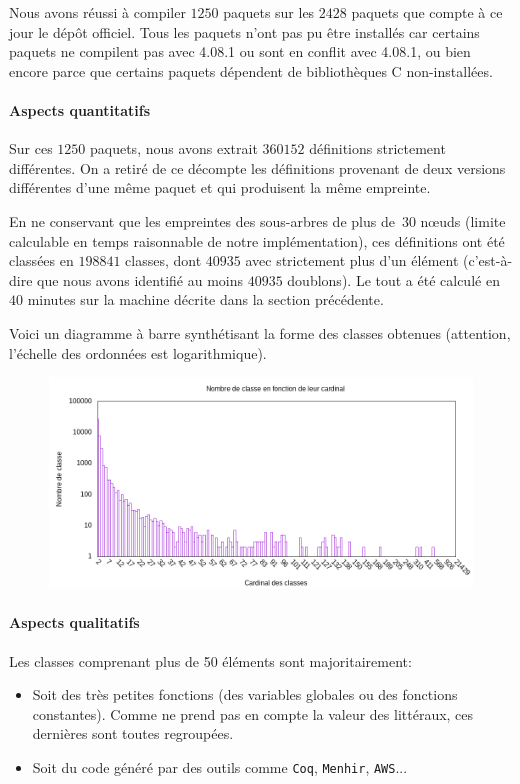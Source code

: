 Nous avons réussi à compiler $1250$ paquets sur les $2428$ paquets que
compte à ce jour le dépôt {\Opam} officiel. Tous les paquets n'ont pas
pu être installés car
certains paquets ne compilent pas avec {\OCaml} 4.08.1 ou
sont en conflit avec {\OCaml} 4.08.1, ou bien encore parce que
certains paquets dépendent de bibliothèques C non-installées.

\paragraph{Aspects quantitatifs}

Sur ces $1250$ paquets, nous avons extrait $360152$ définitions
strictement différentes. On a retiré de ce décompte les définitions
provenant de deux versions différentes d'une même paquet et qui
produisent la même empreinte.

En ne conservant que les empreintes des sous-arbres de plus de~$30$ nœuds
(limite calculable en temps raisonnable de notre implémentation), ces
définitions ont été classées en $198841$ classes, dont $40935$ avec
strictement plus d'un élément (c'est-à-dire que nous avons identifié
au moins $40935$ doublons). Le tout a été calculé en $40$ minutes sur
la machine décrite dans la section précédente.

Voici un diagramme à barre synthétisant la forme des classes obtenues (attention, l'échelle des ordonnées est logarithmique).

\begin{figure}[h]
	\includegraphics[scale=0.6]{figures/bars.png}
\end{figure}

\paragraph{Aspects qualitatifs}

Les classes comprenant plus de 50 éléments sont majoritairement:
\begin{itemize}
\item Soit des très petites fonctions (des variables globales ou des fonctions constantes). Comme {\Asak} ne prend pas en compte la valeur des littéraux, ces dernières sont toutes regroupées.
\item Soit du code généré par des outils comme \verb|Coq|, \verb|Menhir|, \verb|AWS|...
\end{itemize}

